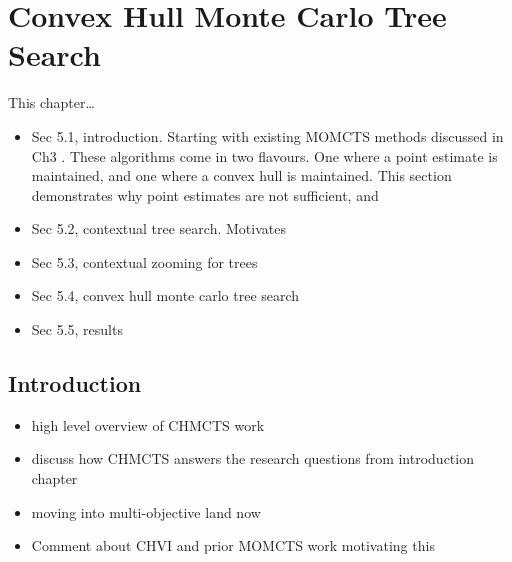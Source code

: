 

\chapter{\label{ch:5-chmcts}Convex Hull Monte Carlo Tree Search} 

    \minitoc



    
    This chapter\dots

    \begin{itemize}
        \item Sec 5.1, introduction. Starting with existing MOMCTS methods discussed in Ch3 . These algorithms come in two flavours. One where a point estimate is maintained, and one where a convex hull is maintained. This section demonstrates why point estimates are not sufficient, and 
        \item Sec 5.2, contextual tree search. Motivates 
        \item Sec 5.3, contextual zooming for trees
        \item Sec 5.4, convex hull monte carlo tree search
        \item Sec 5.5, results
    \end{itemize}



\section{Introduction}
\label{sec:5-1-intro}

    \begin{itemize}
        \item high level overview of CHMCTS work
        \item discuss how CHMCTS answers the research questions from introduction chapter
        \item moving into multi-objective land now
        \item Comment about CHVI and prior MOMCTS work motivating this
    \end{itemize}  

